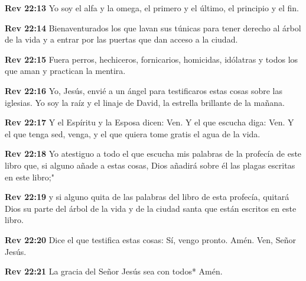 \textbf{Rev 22:13} Yo soy el alfa y la omega, el primero y el último, el principio y el fin. 

\textbf{Rev 22:14} Bienaventurados los que lavan sus túnicas para tener derecho al árbol de la vida y a entrar por las puertas que dan acceso a la ciudad. 

\textbf{Rev 22:15} Fuera perros, hechiceros, fornicarios, homicidas, idólatras y todos los que aman y practican la mentira. 

\textbf{Rev 22:16} Yo, Jesús, envié a un ángel para testificaros estas cosas sobre las iglesias. Yo soy la raíz y el linaje de David, la estrella brillante de la mañana. 

\textbf{Rev 22:17} Y el Espíritu y la Esposa dicen: Ven. Y el que escucha diga: Ven. Y el que tenga sed, venga, y el que quiera tome gratis el agua de la vida. 

\textbf{Rev 22:18} Yo atestiguo a todo el que escucha mis palabras de la profecía de este libro que, si alguno añade a estas cosas, Dios añadirá sobre él las plagas escritas en este libro;" 

\textbf{Rev 22:19} y si alguno quita de las palabras del libro de esta profecía, quitará Dios su parte del árbol de la vida y de la ciudad santa que están escritos en este libro. 

\textbf{Rev 22:20} Dice el que testifica estas cosas: Sí, vengo pronto. Amén. Ven, Señor Jesús. 

\textbf{Rev 22:21} La gracia del Señor Jesús sea con todos* Amén. 

\nopagebreak

\blEndBook


